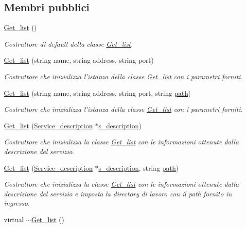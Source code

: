 \subsection*{Membri pubblici}
\begin{DoxyCompactItemize}
\item 
\hyperlink{class_get__list_ab76ae414df34e6cb71e0f5b52ca39c92}{Get\-\_\-list} ()
\begin{DoxyCompactList}\small\item\em Costruttore di default della classe \hyperlink{class_get__list}{Get\-\_\-list}. \end{DoxyCompactList}\item 
\hyperlink{class_get__list_a5eb8a30fb6f1a4c3190f889a3f87129b}{Get\-\_\-list} (string name, string address, string port)
\begin{DoxyCompactList}\small\item\em Costruttore che inizializza l'istanza della classe \hyperlink{class_get__list}{Get\-\_\-list} con i parametri forniti. \end{DoxyCompactList}\item 
\hyperlink{class_get__list_a252524419d25158e1115bec0d023c494}{Get\-\_\-list} (string name, string address, string port, string \hyperlink{class_get__list_a7880b35d31e6171ae53378d9d1d4afca}{path})
\begin{DoxyCompactList}\small\item\em Costruttore che inizializza l'istanza della classe \hyperlink{class_get__list}{Get\-\_\-list} con i parametri forniti. \end{DoxyCompactList}\item 
\hyperlink{class_get__list_a51bc5354d5a3ee2fd6598495725df152}{Get\-\_\-list} (\hyperlink{struct_service__description}{Service\-\_\-description} $\ast$\hyperlink{class_service_a55e991ff18c0dceca202388a771283dc}{s\-\_\-description})
\begin{DoxyCompactList}\small\item\em Costruttore che inizializza la classe \hyperlink{class_get__list}{Get\-\_\-list} con le informazioni ottenute dalla descrizione del servizio. \end{DoxyCompactList}\item 
\hyperlink{class_get__list_ab81f316f9deccbc40f1811cf1c06d718}{Get\-\_\-list} (\hyperlink{struct_service__description}{Service\-\_\-description} $\ast$\hyperlink{class_service_a55e991ff18c0dceca202388a771283dc}{s\-\_\-description}, string \hyperlink{class_get__list_a7880b35d31e6171ae53378d9d1d4afca}{path})
\begin{DoxyCompactList}\small\item\em Costruttore che inizializza la classe \hyperlink{class_get__list}{Get\-\_\-list} con le informazioni ottenute dalla descrizione del servizio e imposta la directory di lavoro con il path fornito in ingresso. \end{DoxyCompactList}\item 
\hypertarget{class_get__list_ad4b5aab752d75ec562db1b8ced98eb76}{virtual \hyperlink{class_get__list_ad4b5aab752d75ec562db1b8ced98eb76}{$\sim$\-Get\-\_\-list} ()}\label{class_get__list_ad4b5aab752d75ec562db1b8ced98eb76}


\end{DoxyCompactItemize}
